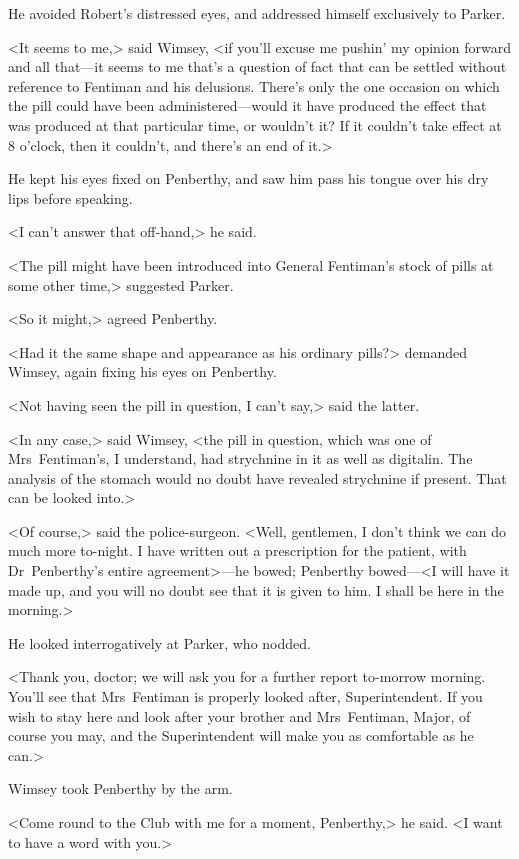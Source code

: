 He avoided Robert's distressed eyes, and addressed himself exclusively to Parker.

<It seems to me,> said Wimsey, <if you'll excuse me pushin' my opinion forward and all that—it seems to me that's a question of fact that can be settled without reference to Fentiman and his delusions. There's only the one occasion on which the pill could have been administered—would it have produced the effect that was produced at that particular time, or wouldn't it? If it couldn't take effect at 8 o'clock, then it couldn't, and there's an end of it.>

He kept his eyes fixed on Penberthy, and saw him pass his tongue over his dry lips before speaking.

<I can't answer that off-hand,> he said.

<The pill might have been introduced into General Fentiman's stock of pills at some other time,> suggested Parker.

<So it might,> agreed Penberthy.

<Had it the same shape and appearance as his ordinary pills?> demanded Wimsey, again fixing his eyes on Penberthy.

<Not having seen the pill in question, I can't say,> said the latter.

<In any case,> said Wimsey, <the pill in question, which was one of Mrs~Fentiman's, I understand, had strychnine in it as well as digitalin. The analysis of the stomach would no doubt have revealed strychnine if present. That can be looked into.>

<Of course,> said the police-surgeon. <Well, gentlemen, I don't think we can do much more to-night. I have written out a prescription for the patient, with Dr~Penberthy's entire agreement>—he bowed; Penberthy bowed—<I will have it made up, and you will no doubt see that it is given to him. I shall be here in the morning.>

He looked interrogatively at Parker, who nodded.

<Thank you, doctor; we will ask you for a further report to-morrow morning. You'll see that Mrs~Fentiman is properly looked after, Superintendent. If you wish to stay here and look after your brother and Mrs~Fentiman, Major, of course you may, and the Superintendent will make you as comfortable as he can.>

Wimsey took Penberthy by the arm.

<Come round to the Club with me for a moment, Penberthy,> he said. <I want to have a word with you.>